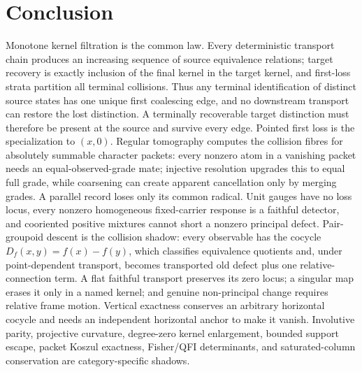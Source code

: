 \documentclass[11pt]{article}
\theoremstyle{definition}
\theoremstyle{remark}
\begin{document}
\section{Conclusion}

Monotone kernel filtration is the common law.  Every deterministic transport
chain produces an increasing sequence of source equivalence relations;
target recovery is exactly inclusion of the final kernel in the target
kernel, and first-loss strata partition all terminal collisions.  Thus any
terminal identification of distinct source states has one unique first coalescing edge, and no
downstream transport can restore the lost distinction.  A terminally
recoverable target distinction must therefore be present at the source and
survive every edge.  Pointed first loss is the specialization to \((x,0)\).
Regular tomography computes the collision fibres for absolutely summable
character packets: every nonzero atom in a vanishing packet needs an
equal-observed-grade mate; injective resolution upgrades this to equal full
grade, while coarsening can create apparent cancellation only by merging
grades.  A parallel record loses only its common radical.
Unit gauges have no loss locus, every nonzero homogeneous fixed-carrier
response is a faithful detector, and cooriented positive mixtures cannot
short a nonzero principal defect.  Pair-groupoid descent is the collision
shadow: every observable has the cocycle \(D_f(x,y)=f(x)-f(y)\), which
classifies equivalence quotients and, under point-dependent transport,
becomes transported old defect plus one relative-connection term.  A flat
faithful transport preserves its zero locus; a singular map erases it only
in a named kernel; and genuine non-principal change requires relative frame
motion.  Vertical exactness conserves an arbitrary horizontal cocycle and
needs an independent horizontal anchor to make it vanish.  Involutive
parity, projective curvature, degree-zero kernel enlargement, bounded
support escape, packet Koszul exactness, Fisher/QFI determinants, and
saturated-column conservation are category-specific shadows.
\end{document}
